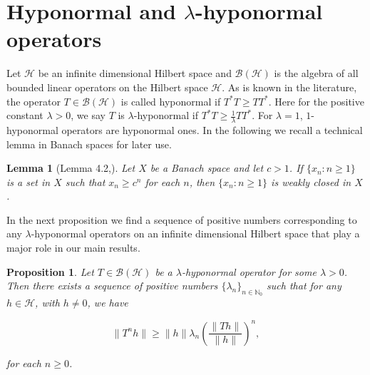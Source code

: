 \documentclass{amsart}
\newtheorem{lem}[thm]{Lemma}
\newtheorem{prop}[thm]{Proposition}
\theoremstyle{definition}\newtheorem{defn}[thm]{Definition}
\theoremstyle{remark}
\numberwithin{equation}{section}
\begin{document}
\section{\sc\bf Hyponormal and $\lambda$-hyponormal operators}

Let $\mathcal{H}$ be an infinite dimensional Hilbert space and $\mathcal{B}(\mathcal{H})$ is the algebra of all bounded linear operators on the Hilbert space $\mathcal{H}$. As is known in the literature, the operator $T\in\mathcal{B}(\mathcal{H})$ is called hyponormal if $T^*T\geq TT^*$. Here for the positive constant $\lambda>0$, we say $T$ is $\lambda$-hyponormal if $T^*T\geq \frac{1}{\lambda}TT^*$. For $\lambda=1$, $1$-hyponormal operators are hyponormal ones. In the following we recall a technical lemma in Banach spaces for later use. 

\begin{lem}[Lemma 4.2,\cite{sand}]\label{l2.1n}
Let $X$ be a Banach space and let $c>1$. If $\{x_n: n\geq 1\}$ is a set in $X$ such that $x_n\geq c^n$ for each $n$, then $\{x_n: n\geq 1\}$ is weakly closed in $X$. 
\end{lem}
In the next proposition we find a sequence of positive numbers corresponding to any $\lambda$-hyponormal operators on an infinite dimensional Hilbert space that play a major role in our main results. 
\begin{prop}\label{p2.1n}
Let $T\in \mathcal{B}(\mathcal{H})$ be a $\lambda$-hyponormal operator for some $\lambda>0$. Then there exists a sequence of positive numbers $\{\lambda_n\}_{n\in\mathbb{N}_0}$ such that for any $h\in \mathcal{H}$, with $h\neq 0$, we have 

$$\|T^nh\|\geq \|h\|\lambda_n\left(\frac{\|Th\|}{\|h\|}\right)^n,$$

for each $n\geq 0$.
\end{prop}
\end{document}
